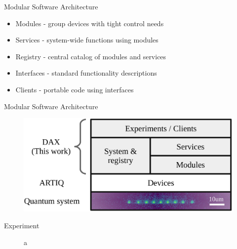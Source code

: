 \documentclass[18 pt]{beamer}
\begin{document}
\begin{frame}{Modular Software Architecture}
\begin{itemize}
\item Modules - group devices with tight control needs
\item Services - system-wide functions using modules
\item Registry - central catalog of modules and services
\item Interfaces - standard functionality descriptions
\item Clients - portable code using interfaces
\end{itemize}
\end{frame}
\begin{frame}{Modular Software Architecture}
  \begin{figure}
    \includegraphics[width=.8\textwidth]{overivew.png}
  \end{figure}
\end{frame}
\begin{frame}{Experiment}
  \begin{figure}
    \caption{a}
  \end{figure}
\end{frame}
\end{document}

